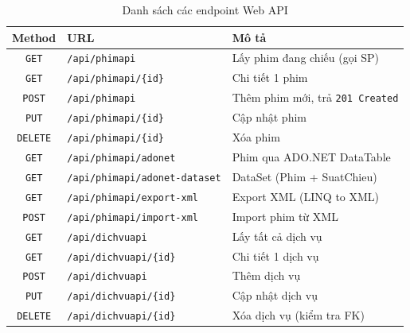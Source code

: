 \documentclass[12pt,a4paper,oneside]{book}
\theoremstyle{plain}
\numberwithin{equation}{chapter}
\begin{document}
\begin{table}[H]
    \begin{center}
        \begin{tabular}{|c|l|l|}
            \hline
            \textbf{Method} & \textbf{URL} & \textbf{Mô tả} \\
            \hline
            \texttt{GET}    & \texttt{/api/phimapi}              & Lấy phim đang chiếu (gọi SP) \\
            \hline
            \texttt{GET}    & \texttt{/api/phimapi/\{id\}}       & Chi tiết 1 phim \\
            \hline
            \texttt{POST}   & \texttt{/api/phimapi}              & Thêm phim mới, trả \texttt{201 Created} \\
            \hline
            \texttt{PUT}    & \texttt{/api/phimapi/\{id\}}       & Cập nhật phim \\
            \hline
            \texttt{DELETE} & \texttt{/api/phimapi/\{id\}}       & Xóa phim \\
            \hline
            \texttt{GET}    & \texttt{/api/phimapi/adonet}       & Phim qua ADO.NET DataTable \\
            \hline
            \texttt{GET}    & \texttt{/api/phimapi/adonet-dataset} & DataSet (Phim + SuatChieu) \\
            \hline
            \texttt{GET}    & \texttt{/api/phimapi/export-xml}   & Export XML (LINQ to XML) \\
            \hline
            \texttt{POST}   & \texttt{/api/phimapi/import-xml}   & Import phim từ XML \\
            \hline
            \hline
            \texttt{GET}    & \texttt{/api/dichvuapi}            & Lấy tất cả dịch vụ \\
            \hline
            \texttt{GET}    & \texttt{/api/dichvuapi/\{id\}}     & Chi tiết 1 dịch vụ \\
            \hline
            \texttt{POST}   & \texttt{/api/dichvuapi}            & Thêm dịch vụ \\
            \hline
            \texttt{PUT}    & \texttt{/api/dichvuapi/\{id\}}     & Cập nhật dịch vụ \\
            \hline
            \texttt{DELETE} & \texttt{/api/dichvuapi/\{id\}}     & Xóa dịch vụ (kiểm tra FK) \\
            \hline
        \end{tabular}
    \end{center}
    \caption{Danh sách các endpoint Web API}\label{table_api}
\end{table}
\end{document}
